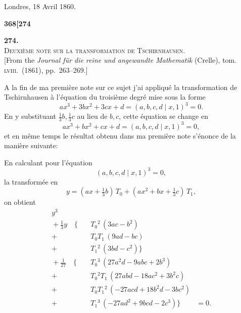 \documentclass[11pt]{article}
\newcommand{\Cdel}{\mid}
\begin{document}
\medskip

\hfill Londres, 18 Avril 1860.


\newpage
\noindent\textbf{368}\hfill\textbf{[274}

\medskip

\begin{center}
{\Large\bfseries 274.}\\[1em]
{\large\scshape Deuxi\`eme note sur la transformation de Tschirnhausen.}\\[1em]
{\small [From the \textit{Journal f\"ur die reine und angewandte Mathematik} (Crelle), tom. \textsc{lviii}.\ (1861), pp.~263--269.]}
\end{center}

\medskip

\noindent A la fin de ma premi\`ere note sur ce sujet j'ai appliqu\'e la transformation de Tschirnhausen \`a l'\'equation du troisi\`eme degr\'e mise sous la forme
\[
a x^3 + 3 b x^2 + 3 c x + d = (a, b, c, d \Cdel x, 1)^3 = 0.
\]
En y substituant $\tfrac{1}{3} b, \tfrac{1}{3} c$ au lieu de $b, c$, cette \'equation se change en
\[
a x^3 + b x^2 + c x + d = (a, b, c, d \Cdel x, 1)^3 = 0,
\]
et en m\^eme temps le r\'esultat obtenu dans ma premi\`ere note s'\'enonce de la mani\`ere suivante:

\medskip

En calculant pour l'\'equation
\[
(a, b, c, d \Cdel x, 1)^3 = 0,
\]
la transform\'ee en
\[
y = (a x + \tfrac{1}{3} b)\, T_0 + (a x^2 + b x + \tfrac{1}{3} c)\, T_1,
\]
on obtient
\[
\begin{aligned}
y^3 \quad &\\
{} + \tfrac{1}{3} y \quad \bigg\{ \quad &T_0{}^2\,(3 a c - b^2) \\
+\quad & T_0 T_1\,(9 a d - b c) \\
+\quad & T_1{}^2\,(3 b d - c^2) \bigg\} \\
{} + \tfrac{1}{27}\quad \bigg\{ \quad & T_0{}^3\,(27 a^2 d - 9 a b c + 2 b^3) \\
+\quad & T_0{}^2 T_1\,(27 a b d - 18 a c^2 + 3 b^2 c) \\
+\quad & T_0 T_1{}^2\,(-27 a c d + 18 b^2 d - 3 b c^2) \\
+\quad & T_1{}^3\,(-27 a d^2 + 9 b c d - 2 c^3) \bigg\} &= 0.
\end{aligned}
\]
\end{document}
